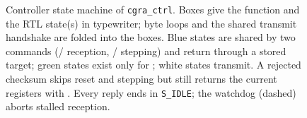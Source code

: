 \begin{figure}[t]
  \centering
  \resizebox{\textwidth}{!}{}
  \caption{Controller state machine of \texttt{cgra\_ctrl}. Boxes give the
  function and the RTL state(s) in typewriter; byte loops and the shared
  transmit handshake are folded into the boxes. Blue states are shared by two
  commands (/ reception, / stepping) and
  return through a stored target; green states exist only for ;
  white states transmit. A rejected  checksum skips reset and
  stepping but still returns the current registers with . Every
  reply ends in \texttt{S\_IDLE}; the watchdog (dashed) aborts stalled
  reception.}
  \label{fig:fsm}
\end{figure}
